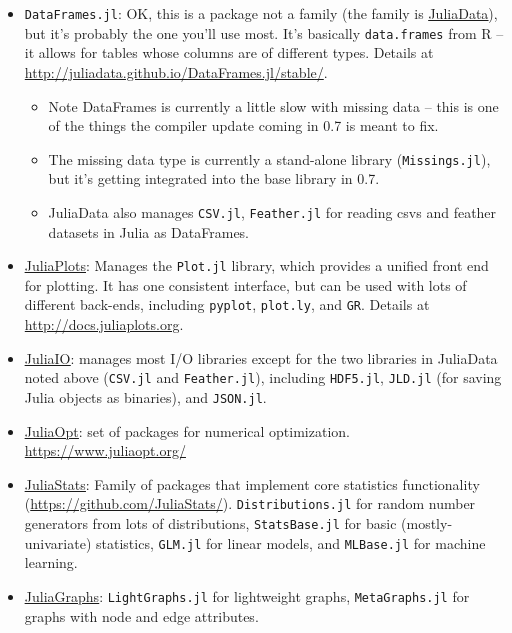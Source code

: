 \documentclass[12pt]{article}
\begin{document}
\begin{itemize}
    \item \texttt{DataFrames.jl}: OK, this is a package not a family (the family is \href{https://github.com/JuliaData}{\underline{JuliaData}}), but it's probably the one you'll use most. It's basically \texttt{data.frames} from R -- it allows for tables whose columns are of different types. Details at \url{http://juliadata.github.io/DataFrames.jl/stable/}.
    \begin{itemize}
        \item Note DataFrames is currently a little slow with missing data -- this is one of the things the compiler update coming in 0.7 is meant to fix.
        \item The missing data type is currently a stand-alone library (\texttt{Missings.jl}), but it's getting integrated into the base library in 0.7.
        \item JuliaData also manages \texttt{CSV.jl}, \texttt{Feather.jl} for reading csvs and feather datasets in Julia as DataFrames.
    \end{itemize}
    \item \href{http://docs.juliaplots.org}{\underline{JuliaPlots}}: Manages the \texttt{Plot.jl} library, which provides a unified front end for plotting. It has one consistent interface, but can be used with lots of different back-ends, including \texttt{pyplot}, \texttt{plot.ly}, and \texttt{GR}. Details at \url{http://docs.juliaplots.org}.
    \item \href{https://github.com/JuliaIO/}{\underline{JuliaIO}}: manages most I/O libraries except for the two libraries in JuliaData noted above (\texttt{CSV.jl} and \texttt{Feather.jl}), including \texttt{HDF5.jl}, \texttt{JLD.jl} (for saving Julia objects as binaries), and \texttt{JSON.jl}.
    \item \href{https://www.juliaopt.org/}{\underline{JuliaOpt}}: set of packages for numerical optimization. \url{https://www.juliaopt.org/}
    \item \href{http://juliastats.github.io/}{\underline{JuliaStats}}: Family of packages that implement core statistics functionality (\url{https://github.com/JuliaStats/}). \texttt{Distributions.jl} for random number generators from lots of distributions, \texttt{StatsBase.jl} for basic (mostly-univariate) statistics, \texttt{GLM.jl} for linear models, and \texttt{MLBase.jl} for machine learning.
    \item \href{https://github.com/JuliaGraphs}{\underline{JuliaGraphs}}: \texttt{LightGraphs.jl} for lightweight graphs, \texttt{MetaGraphs.jl} for graphs with node and edge attributes.
\end{itemize}
\end{document}

